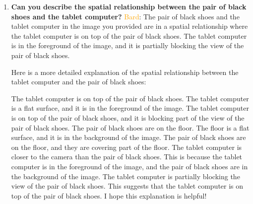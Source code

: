 \begin{enumerate}
    \item \textbf{Can you describe the spatial relationship between the pair of black shoes and the tablet computer?}
    \subitem \textcolor{orange}{Bard}: The pair of black shoes and the tablet computer in the image you provided are in a spatial relationship where the tablet computer is on top of the pair of black shoes. The tablet computer is in the foreground of the image, and it is partially blocking the view of the pair of black shoes.

    Here is a more detailed explanation of the spatial relationship between the tablet computer and the pair of black shoes:
    
    The tablet computer is on top of the pair of black shoes. The tablet computer is a flat surface, and it is in the foreground of the image. The tablet computer is on top of the pair of black shoes, and it is blocking part of the view of the pair of black shoes.
    The pair of black shoes are on the floor. The floor is a flat surface, and it is in the background of the image. The pair of black shoes are on the floor, and they are covering part of the floor.
    The tablet computer is closer to the camera than the pair of black shoes. This is because the tablet computer is in the foreground of the image, and the pair of black shoes are in the background of the image.
    The tablet computer is partially blocking the view of the pair of black shoes. This suggests that the tablet computer is on top of the pair of black shoes.
    I hope this explanation is helpful!
    

\end{enumerate}
